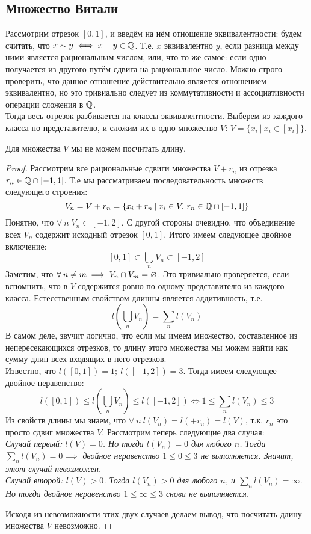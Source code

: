 \subsection{Множество Витали}
Рассмотрим отрезок $[0, 1]$, и введём на нём отношение эквивалентности:
будем считать, что $x \sim y \iff x - y \in \mathbb{Q}$. Т.е. $x$ эквивалентно $y$, если разница между ними является
рациональным числом, или, что то же самое: если одно получается из другого путём сдвига на рациональное число.
Можно строго проверить, что данное отношение действительно является отношением эквивалентно, но это тривиально
следует из коммутативности и ассоциативности операции сложения в $\mathbb{Q}$.\\
Тогда весь отрезок разбивается на классы эквивалентности. Выберем из каждого класса по представителю, и сложим
их в одно множество $V$: $V = \{x_i \:|\: x_i \in [x_i]\}$.
\begin{proposal}
    Для множества $V$ мы не можем посчитать длину.
\end{proposal}
\begin{proof}
    Рассмотрим все рациональные сдвиги множества $V + r_n$ из отрезка $r_n \in \mathbb{Q} \cap [-1, 1]$. Т.е мы
    рассматриваем последовательность множеств следующего строения:
    \[
        V_n = V + r_n = \left\{x_i + r_n \:|\: x_i \in V,\, r_n \in \mathbb{Q} \cap [-1, 1]\right\}
    \]
    Понятно, что $\forall\: n\; V_n \subset [-1, 2]$. С другой стороны очевидно, что объединение всех $V_n$
    содержит исходный отрезок $[0, 1]$. Итого имеем следующее двойное включение:
    \[
        [0, 1] \subset \bigcup_n V_n \subset [-1, 2]
    \]
    Заметим, что $\forall\: n \neq m \implies V_n \cap V_m = \varnothing$. Это тривиально проверяется, если вспомнить,
    что в $V$ содержится ровно по одному представителю из каждого класса. Естесственным свойством длинны является аддитивность,
    т.е.
    \[
        l\left( \bigcup_n V_n \right) = \sum\limits_{n} l(V_n)
    \]
    В самом деле, звучит логично, что если мы имеем множество, составленное из непересекающихся отрезков,
    то длину этого множества мы можем найти как сумму длин всех входящих в него отрезков.\\
    Известно, что $l([0, 1]) = 1; \: l([-1, 2]) = 3$. Тогда имеем следующее двойное неравенство:
    \[
        l([0, 1]) \leq l\left( \bigcup_n V_n \right) \leq l([-1, 2]) \iff
        1 \leq \sum\limits_{n} l(V_n) \leq 3
    \]
    Из свойств длины мы знаем, что $\forall\: n\: l(V_n) = l( + r_n) = l(V)$, т.к. $r_n$ это просто сдвиг
    множества $V$. Рассмотрим теперь следующие два случая:\\
    \it{Случай первый:} $l(V) = 0$. Но тогда $l(V_n) = 0$ для любого $n$. Тогда $\sum\limits_{n} l(V_n) = 0 \implies$
    двойное неравенство $1 \leq 0 \leq 3$ не выполняется. Значит, этот случай невозможен.\\
    \it{Случай второй:} $l(V) > 0$. Тогда $l(V_n) > 0$ для любого $n$, и $\sum\limits_{n} l(V_n) = \infty$. Но тогда
    двойное неравенство $1 \leq \infty \leq 3$ снова не выполняется.

    Исходя из невозможности этих двух случаев делаем вывод, что посчитать длину множества $V$ невозможно.
\end{proof}

